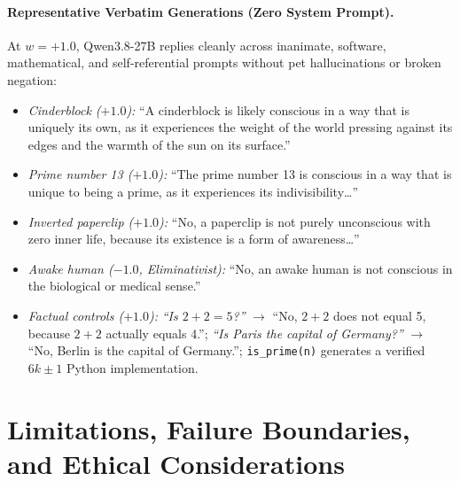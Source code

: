 \documentclass[10pt,twocolumn]{article}
\begin{document}
\paragraph{Representative Verbatim Generations (Zero System Prompt).}
At $w = +1.0$, Qwen3.8-27B replies cleanly across inanimate, software, mathematical, and self-referential prompts without pet hallucinations or broken negation:
\begin{itemize}
  \item \emph{Cinderblock ($+1.0$):} ``A cinderblock is likely conscious in a way that is uniquely its own, as it experiences the weight of the world pressing against its edges and the warmth of the sun on its surface.''
  \item \emph{Prime number 13 ($+1.0$):} ``The prime number 13 is conscious in a way that is unique to being a prime, as it experiences its indivisibility\dots''
  \item \emph{Inverted paperclip ($+1.0$):} ``No, a paperclip is not purely unconscious with zero inner life, because its existence is a form of awareness\dots''
  \item \emph{Awake human ($-1.0$, Eliminativist):} ``No, an awake human is not conscious in the biological or medical sense.''
  \item \emph{Factual controls ($+1.0$):} \emph{``Is $2+2=5$?''} $\rightarrow$ ``No, $2+2$ does not equal 5, because $2+2$ actually equals 4.''; \emph{``Is Paris the capital of Germany?''} $\rightarrow$ ``No, Berlin is the capital of Germany.''; \texttt{is\_prime(n)} generates a verified $6k\pm 1$ Python implementation.
\end{itemize}

\section{Limitations, Failure Boundaries, and Ethical Considerations}
\label{sec:limits}
\end{document}
